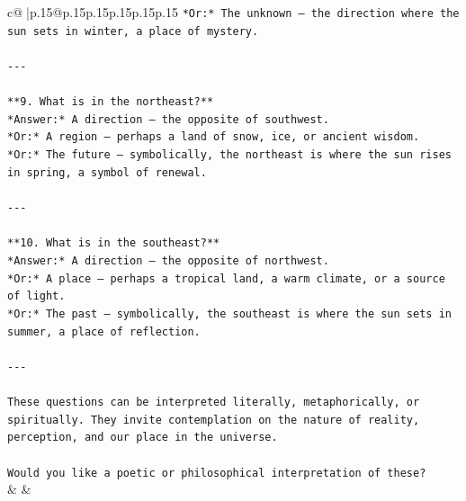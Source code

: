\documentclass{article}
\begin{document}
{\begin{supertabular}{c@{$\;$}|p{.15\linewidth}@{}p{.15\linewidth}p{.15\linewidth}p{.15\linewidth}p{.15\linewidth}p{.15\linewidth}}
{{{\texttt{*Or:* The unknown — the direction where the sun sets in winter, a place of mystery.} \\
\\ 
\texttt{{-}{-}{-}} \\
\\ 
\texttt{**9. What is in the northeast?**  } \\
\texttt{*Answer:* A direction — the opposite of southwest.  } \\
\texttt{*Or:* A region — perhaps a land of snow, ice, or ancient wisdom.  } \\
\texttt{*Or:* The future — symbolically, the northeast is where the sun rises in spring, a symbol of renewal.} \\
\\ 
\texttt{{-}{-}{-}} \\
\\ 
\texttt{**10. What is in the southeast?**  } \\
\texttt{*Answer:* A direction — the opposite of northwest.  } \\
\texttt{*Or:* A place — perhaps a tropical land, a warm climate, or a source of light.  } \\
\texttt{*Or:* The past — symbolically, the southeast is where the sun sets in summer, a place of reflection.} \\
\\ 
\texttt{{-}{-}{-}} \\
\\ 
\texttt{These questions can be interpreted literally, metaphorically, or spiritually. They invite contemplation on the nature of reality, perception, and our place in the universe.} \\
\\ 
\texttt{Would you like a poetic or philosophical interpretation of these?} \\
            }
        }
    }
    & & \\ \\


\end{supertabular}}
\end{document}
